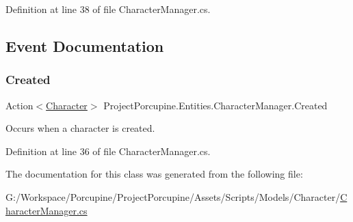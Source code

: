 Definition at line 38 of file Character\+Manager.\+cs.



\subsection{Event Documentation}
\mbox{\label{class_project_porcupine_1_1_entities_1_1_character_manager_a6de593fee27b425be723fd43231cc1fc}} 
\subsubsection{\texorpdfstring{Created}{Created}}
{\footnotesize\ttfamily Action$<$\hyperlink{class_project_porcupine_1_1_entities_1_1_character}{Character}$>$ Project\+Porcupine.\+Entities.\+Character\+Manager.\+Created}



Occurs when a character is created. 



Definition at line 36 of file Character\+Manager.\+cs.



The documentation for this class was generated from the following file\+:\begin{DoxyCompactItemize}
\item 
G\+:/\+Workspace/\+Porcupine/\+Project\+Porcupine/\+Assets/\+Scripts/\+Models/\+Character/\hyperlink{_character_manager_8cs}{Character\+Manager.\+cs}\end{DoxyCompactItemize}
